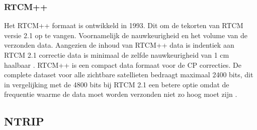 \subsubsection{RTCM++}
Het RTCM++ formaat is ontwikkeld in 1993. Dit om de tekorten van RTCM versie 2.1 op te vangen. Voornamelijk de nauwkeurigheid en het volume van de verzonden data. Aangezien de inhoud van RTCM++ data is indentiek aan RTCM 2.1 correctie data is minimaal de zelfde nauwkeurigheid van 1 cm haalbaar \cite{LBibRTCM3}. RTCM++ is een compact data formaat voor de CP correcties. De complete dataset voor alle zichtbare satellieten bedraagt maximaal 2400 bits, dit in vergelijking met de 4800 bits bij RTCM 2.1 een betere optie omdat de frequentie waarme de data moet worden verzonden niet zo hoog moet zijn \cite{LBibRTCM4}. 


\subsection{NTRIP}
\label{LNTR}
